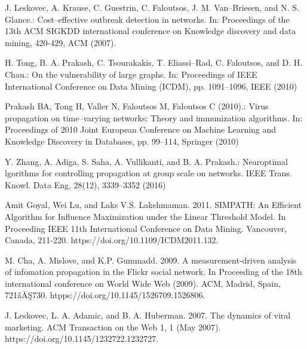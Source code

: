 \begin{thebibliography}{4}
	 J. Leskovec, A. Krause, C. Guestrin, C. Faloutsos, J. M. Van–Briesen, and N. S. Glance.: Cost–effective outbreak detection in networks. In: Proceedings of the 13th ACM SIGKDD international conference on Knowledge discovery and data mining, 420-429, ACM (2007).
	
	 H. Tong, B. A. Prakash, C. Tsourakakis, T. Eliassi--Rad, C. Faloutsos, and D. H. Chau.: On the vulnerability of large graphs. In: Proceedings of IEEE International Conference on  Data Mining  (ICDM), pp. 1091--1096, IEEE (2010)
	
	 Prakash BA, Tong H, Valler N, Faloutsos M, Faloutsos C (2010).: Virus propagation on time--varying networks: Theory and immunization algorithms. In: Proceedings of 2010 Joint European Conference on Machine Learning and Knowledge Discovery in Databases, pp. 99--114, Springer (2010)
	
	 Y. Zhang, A. Adiga, S. Saha, A. Vullikanti, and B. A. Prakash.: Nearoptimal lgorithms for controlling propagation at group scale on networks. IEEE Trans. Knowl. Data Eng, 28(12), 3339--3352 (2016)
	
	 Amit Goyal, Wei Lu, and Laks V.S. Lakshmaman. 2011. SIMPATH: An Efficient Algorithm for Influence Maximization under the Linear Threshold Model. In Proceeding IEEE 11th International Conference on Data Mining. Vancouver, Canada, 211-220. https://doi.org/10.1109/ICDM2011.132.
	
	 M. Cha, A. Mislove, and K.P. Gummadd. 2009. A measurement-driven analysis of infomation propagation in the Flickr social network. In Proceeding of the 18th international conference on World Wide Web (2009). ACM, Madrid, Spain, 721âĂŞ730. htpps://doi.org/10.1145/1526709.1526806.
	
	 J. Leskovec, L. A. Adamic, and B. A. Huberman. 2007. The dynamics of viral marketing. ACM Transaction on the Web 1, 1 (May 2007). https://doi.org/10.1145/1232722.1232727. 
	
	
	
\end{thebibliography}